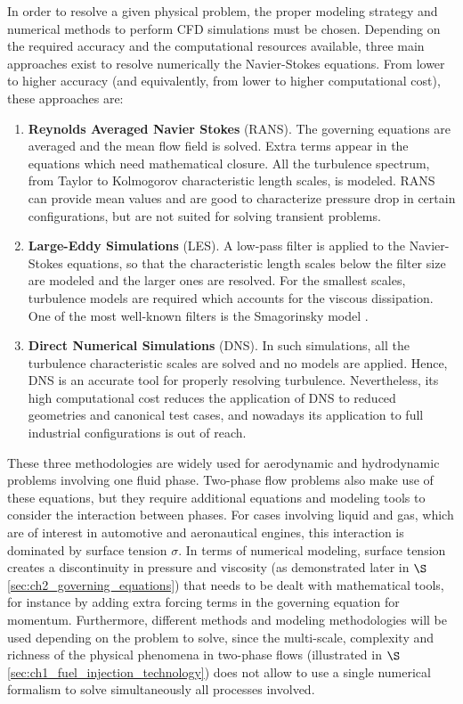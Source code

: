 In order to resolve a given physical problem, the proper modeling strategy and numerical methods to perform CFD simulations must be chosen. Depending on the required accuracy and the computational resources available, three main approaches exist to resolve numerically the Navier-Stokes equations. From lower to higher accuracy (and equivalently, from lower to higher computational cost), these approaches are:

\begin{enumerate}

	\item \textbf{Reynolds Averaged Navier Stokes} (RANS). The governing equations are averaged and the mean flow field is solved. Extra terms appear in the equations which need mathematical closure. All the turbulence spectrum, from Taylor to Kolmogorov characteristic length scales, is modeled. RANS can provide mean values and are good to characterize pressure drop in certain configurations, but are not suited for solving transient problems.
	
	\item \textbf{Large-Eddy Simulations} (LES). A low-pass filter is applied to the Navier-Stokes equations, so that the characteristic length scales below the filter size are modeled and the larger ones are resolved. For the smallest scales, turbulence models are required which accounts for the viscous dissipation. One of the most well-known filters is the Smagorinsky model .
	
	\item \textbf{Direct Numerical Simulations} (DNS). In such simulations, all the turbulence characteristic scales are solved and no models are applied. Hence, DNS is an accurate tool for properly resolving turbulence. Nevertheless, its high computational cost reduces the application of DNS to reduced geometries and canonical test cases, and nowadays its application to full industrial configurations is out of reach.

\end{enumerate}

These three methodologies are widely used for aerodynamic and hydrodynamic problems involving one fluid phase. Two-phase flow problems also make use of these equations, but they require additional equations and modeling tools to consider the interaction between phases. For cases involving liquid and gas, which are of interest in automotive and aeronautical engines, this interaction is dominated by surface tension $\sigma$. In terms of numerical modeling, surface tension creates a discontinuity in pressure and viscosity (as demonstrated later in $\S$\ref{sec:ch2_governing_equations}) that needs to be dealt with mathematical tools, for instance by adding extra forcing terms in the governing equation for momentum. Furthermore, different methods and modeling methodologies will be used depending on the problem to solve, since the multi-scale, complexity and richness of the physical phenomena in two-phase flows (illustrated in $\S$\ref{sec:ch1_fuel_injection_technology}) does not allow to use a single numerical formalism to solve simultaneously all processes involved.

